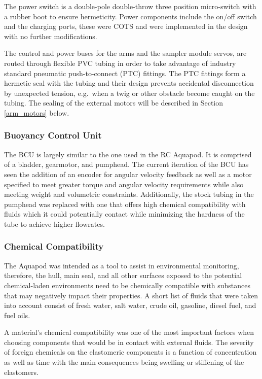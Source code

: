  		The power switch is a double-pole double-throw three position micro-switch with a rubber boot to ensure hermeticity. Power components include the on/off switch and the charging ports, these were COTS and were implemented in the design with no further modifications. 

		The control and power buses for the arms and the sampler module servos, are routed through flexible PVC tubing in order to take advantage of industry standard pneumatic push-to-connect (PTC) fittings.  The PTC fittings form a hermetic seal with the tubing and their design prevents accidental disconnection by unexpected tension, e.g.\ when a twig or other obstacle become caught on the tubing. The sealing of the external motors will be described in Section \ref{arm_motors} below. 

	\subsubsection{Buoyancy Control Unit}
		The BCU is largely similar to the one used in the RC Aquapod. It is comprised of a bladder, gearmotor, and pumphead.  The current iteration of the BCU has seen the addition of an encoder for angular velocity feedback as well as a motor specified to meet greater torque and angular velocity requirements while also meeting weight and volumetric constraints.  Additionally, the stock tubing in the pumphead was replaced with one that offers high chemical compatibility with fluids which it could potentially contact while minimizing the hardness of the tube to achieve higher flowrates. 

	\subsubsection{Chemical Compatibility}
		 The Aquapod was intended as a tool to assist in environmental monitoring, therefore, the hull, main seal, and all other surfaces exposed to the potential chemical-laden environments need to be chemically compatible with substances that may negatively impact their properties. A short list of fluids that were taken into account consist of fresh water, salt water, crude oil, gasoline, diesel fuel, and fuel oils.
		  
		  A material's chemical compatibility was one of the most important factors when choosing components that would be in contact with external fluids. The severity of foreign chemicals on the elastomeric components is a function of concentration as well as time with the main consequences being swelling or stiffening of the elastomers.
	
